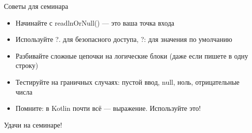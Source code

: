 \documentclass[aspectratio=169]{beamer}
\begin{document}
\begin{frame}{Советы для семинара}
  \begin{itemize}
    \item Начинайте с readlnOrNull() — это ваша точка входа
    \item Используйте ?. для безопасного доступа, ?: для значения по умолчанию
    \item Разбивайте сложные цепочки на логические блоки (даже если пишете в одну строку)
    \item Тестируйте на граничных случаях: пустой ввод, null, ноль, отрицательные числа
    \item Помните: в Kotlin почти всё — выражение. Используйте это!
  \end{itemize}
  \centering
  \Large Удачи на семинаре!
\end{frame}
\end{document}

